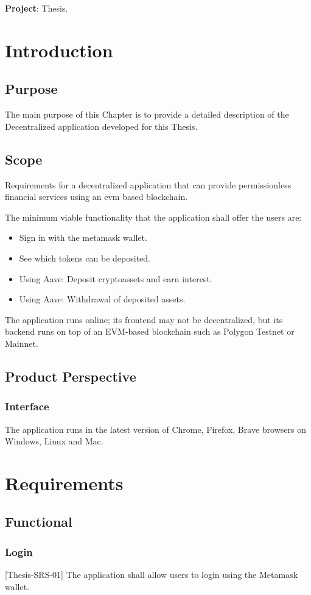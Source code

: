 \documentclass[11pt,a4paper]{report}
\begin{document}
\textbf{Project}: Thesis.
\section{Introduction}
\subsection{Purpose}
The main purpose of this Chapter is to provide a detailed description of the Decentralized application developed for this Thesis. 
\subsection{Scope}
Requirements for a decentralized application that can provide
permissionless financial services using an evm based blockchain.

The minimum viable functionality that the application shall offer the users are:
\begin{itemize}
	\item Sign in with the metamask wallet.
	\item See which tokens can be deposited.
	\item Using Aave: Deposit cryptoassets and earn interest. 
	\item Using Aave: Withdrawal of deposited assets.
\end{itemize}
The application runs online; its frontend may not be decentralized, but its backend runs on top of an EVM-based blockchain such as Polygon Testnet or Mainnet.
\subsection{Product Perspective}
\subsubsection{Interface}
The application runs in the latest version of Chrome, Firefox, Brave browsers on Windows, Linux and Mac.

\section{Requirements}
\subsection{Functional}
\subsubsection{Login}
[Thesis-SRS-01] The application shall allow users to login using the Metamask\cite{wiki:MetaMask} wallet.
\end{document}
